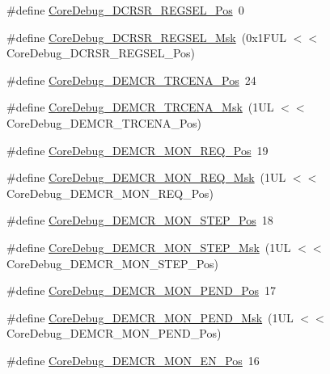\begin{DoxyCompactItemize}
\#define \hyperlink{group___c_m_s_i_s___core_debug_ga52182c8a9f63a52470244c0bc2064f7b}{Core\-Debug\-\_\-\-D\-C\-R\-S\-R\-\_\-\-R\-E\-G\-S\-E\-L\-\_\-\-Pos}~0
\item 
\#define \hyperlink{group___c_m_s_i_s___core_debug_ga17cafbd72b55030219ce5609baa7c01d}{Core\-Debug\-\_\-\-D\-C\-R\-S\-R\-\_\-\-R\-E\-G\-S\-E\-L\-\_\-\-Msk}~(0x1\-F\-U\-L $<$$<$ Core\-Debug\-\_\-\-D\-C\-R\-S\-R\-\_\-\-R\-E\-G\-S\-E\-L\-\_\-\-Pos)
\item 
\#define \hyperlink{group___c_m_s_i_s___core_debug_ga6ff2102b98f86540224819a1b767ba39}{Core\-Debug\-\_\-\-D\-E\-M\-C\-R\-\_\-\-T\-R\-C\-E\-N\-A\-\_\-\-Pos}~24
\item 
\#define \hyperlink{group___c_m_s_i_s___core_debug_ga5e99652c1df93b441257389f49407834}{Core\-Debug\-\_\-\-D\-E\-M\-C\-R\-\_\-\-T\-R\-C\-E\-N\-A\-\_\-\-Msk}~(1\-U\-L $<$$<$ Core\-Debug\-\_\-\-D\-E\-M\-C\-R\-\_\-\-T\-R\-C\-E\-N\-A\-\_\-\-Pos)
\item 
\#define \hyperlink{group___c_m_s_i_s___core_debug_ga341020a3b7450416d72544eaf8e57a64}{Core\-Debug\-\_\-\-D\-E\-M\-C\-R\-\_\-\-M\-O\-N\-\_\-\-R\-E\-Q\-\_\-\-Pos}~19
\item 
\#define \hyperlink{group___c_m_s_i_s___core_debug_gae6384cbe8045051186d13ef9cdeace95}{Core\-Debug\-\_\-\-D\-E\-M\-C\-R\-\_\-\-M\-O\-N\-\_\-\-R\-E\-Q\-\_\-\-Msk}~(1\-U\-L $<$$<$ Core\-Debug\-\_\-\-D\-E\-M\-C\-R\-\_\-\-M\-O\-N\-\_\-\-R\-E\-Q\-\_\-\-Pos)
\item 
\#define \hyperlink{group___c_m_s_i_s___core_debug_ga9ae10710684e14a1a534e785ef390e1b}{Core\-Debug\-\_\-\-D\-E\-M\-C\-R\-\_\-\-M\-O\-N\-\_\-\-S\-T\-E\-P\-\_\-\-Pos}~18
\item 
\#define \hyperlink{group___c_m_s_i_s___core_debug_ga2ded814556de96fc369de7ae9a7ceb98}{Core\-Debug\-\_\-\-D\-E\-M\-C\-R\-\_\-\-M\-O\-N\-\_\-\-S\-T\-E\-P\-\_\-\-Msk}~(1\-U\-L $<$$<$ Core\-Debug\-\_\-\-D\-E\-M\-C\-R\-\_\-\-M\-O\-N\-\_\-\-S\-T\-E\-P\-\_\-\-Pos)
\item 
\#define \hyperlink{group___c_m_s_i_s___core_debug_ga1e2f706a59e0d8131279af1c7e152f8d}{Core\-Debug\-\_\-\-D\-E\-M\-C\-R\-\_\-\-M\-O\-N\-\_\-\-P\-E\-N\-D\-\_\-\-Pos}~17
\item 
\#define \hyperlink{group___c_m_s_i_s___core_debug_ga68ec55930269fab78e733dcfa32392f8}{Core\-Debug\-\_\-\-D\-E\-M\-C\-R\-\_\-\-M\-O\-N\-\_\-\-P\-E\-N\-D\-\_\-\-Msk}~(1\-U\-L $<$$<$ Core\-Debug\-\_\-\-D\-E\-M\-C\-R\-\_\-\-M\-O\-N\-\_\-\-P\-E\-N\-D\-\_\-\-Pos)
\item 
\#define \hyperlink{group___c_m_s_i_s___core_debug_ga802829678f6871863ae9ecf60a10425c}{Core\-Debug\-\_\-\-D\-E\-M\-C\-R\-\_\-\-M\-O\-N\-\_\-\-E\-N\-\_\-\-Pos}~16
$$
\end{DoxyCompactItemize}
